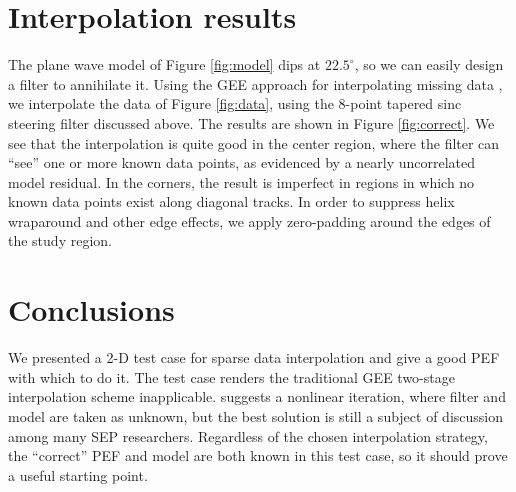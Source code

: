 
\section{ Interpolation results}

	The plane wave model of Figure \ref{fig:model} dips at $22.5^{\circ}$, so we can easily design a 
	filter to annihilate it.  Using the GEE approach for interpolating missing data \cite[]{gee}, we 
	interpolate the data of Figure \ref{fig:data}, using the 8-point tapered sinc steering filter
	discussed above.  The results are shown in Figure \ref{fig:correct}.  We see that the 
	interpolation is quite good in the center region, where the filter can ``see'' one or more known 
	data points, as evidenced by a nearly uncorrelated model residual.  In the corners, the result 
	is imperfect 
	in regions in which no known data points exist along diagonal tracks.  In order to suppress 
	helix wraparound and other edge effects, we apply zero-padding around the edges of the study 
	region. 


\section{ Conclusions }

	We presented a 2-D test case for sparse data interpolation and give a good PEF with which to do it.
	The test case renders the traditional GEE two-stage interpolation scheme inapplicable.
	\cite{Claerbout.sep.103.jon5} suggests a nonlinear iteration, where filter and model 
	are taken as unknown, but the best solution is still a subject of discussion among many SEP
	researchers.  Regardless of the chosen interpolation strategy, the ``correct'' PEF 
	and model are both known in this test case, so it should prove a useful starting point.

 
 
